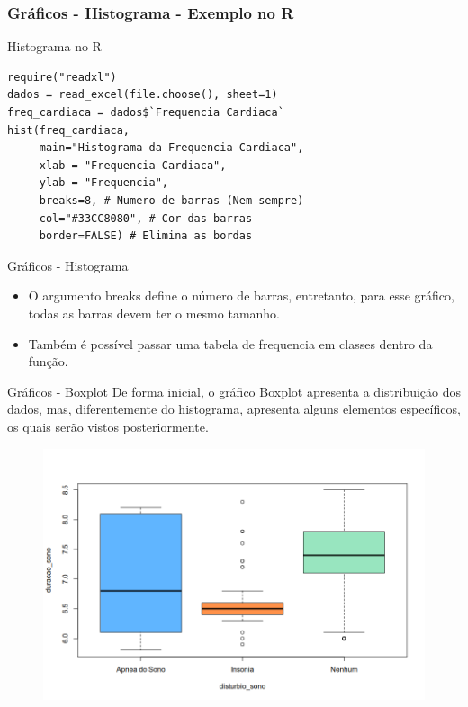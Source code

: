 \begin{frame}[fragile]
\frametitle{Gráficos - Histograma - Exemplo no R}
\begin{block}{Histograma no R}
\begin{verbatim}
require("readxl")
dados = read_excel(file.choose(), sheet=1) 
freq_cardiaca = dados$`Frequencia Cardiaca`
hist(freq_cardiaca, 
     main="Histograma da Frequencia Cardiaca",
     xlab = "Frequencia Cardiaca",
     ylab = "Frequencia",
     breaks=8, # Numero de barras (Nem sempre)
     col="#33CC8080", # Cor das barras
     border=FALSE) # Elimina as bordas
\end{verbatim}
\end{block}
\end{frame}

\begin{frame}{Gráficos - Histograma}
    \begin{itemize}
        \item O argumento breaks define o número de barras, entretanto, para esse gráfico, todas as barras devem ter o mesmo tamanho. 
        \pause
        \item Também é possível passar uma tabela de frequencia em classes dentro da função. 
    \end{itemize}
\end{frame}

\begin{frame}{Gráficos - Boxplot}
    De forma inicial, o gráfico Boxplot apresenta a distribuição dos dados, mas, diferentemente do histograma, apresenta alguns elementos específicos, os quais
    serão vistos posteriormente. 

    \pause

    \begin{figure}
        \centering
        \includegraphics[width=0.8\linewidth]{figures/grafico_boxplot.png}
    \end{figure}
\end{frame}

